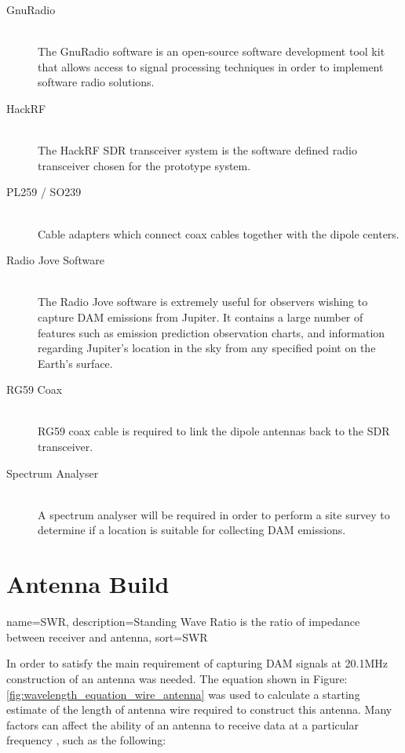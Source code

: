 \documentclass[runningheads,a4paper]{llncs}
\begin{document}
\begin{description}
  \item[GnuRadio] \hfill \\
  The GnuRadio software is an open-source software development tool kit that allows access to signal processing techniques in order to implement software radio solutions.
  \item[HackRF] \hfill \\
  The HackRF \gls{SDR} transceiver system is the software defined radio transceiver chosen for the prototype system.
  \item[PL259 / SO239] \hfill \\
  Cable adapters which connect coax cables together with the dipole centers.
  \item[Radio Jove Software] \hfill \\
  The Radio Jove software is extremely useful for observers wishing to capture \gls{DAM} emissions from Jupiter. It contains a large number of features such as emission prediction observation charts, and information regarding Jupiter's location in the sky from any specified point on the Earth's surface.
  \item[RG59 Coax] \hfill \\
  RG59 coax cable is required to link the dipole antennas back to the \gls{SDR} transceiver.
  \item[Spectrum Analyser] \hfill \\
  A spectrum analyser will be required in order to perform a site survey to determine if a location is suitable for collecting \gls{DAM} emissions.
\end{description}


\section*{Antenna Build}

{
  name={SWR},
  description={Standing Wave Ratio is the ratio of impedance between receiver and antenna},
  sort=SWR
}

In order to satisfy the main requirement of capturing \gls{DAM} signals at 20.1MHz construction of an antenna was needed. The equation shown in Figure: \ref{fig:wavelength_equation_wire_antenna} was used to calculate a starting estimate of the length of antenna wire required to construct this antenna. Many factors can affect the ability of an antenna to receive data at a particular frequency \citep{arrl-00}, such as the following:
\end{document}
